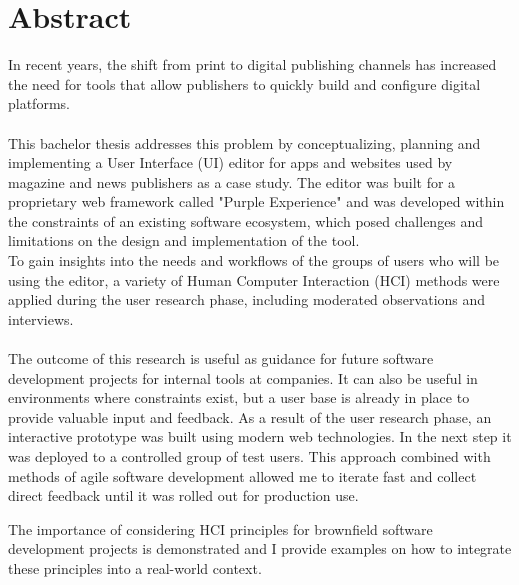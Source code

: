 %

\chapter{Abstract}

In recent years, the shift from print to digital publishing channels has increased the need for tools that allow publishers to quickly build and configure digital platforms.
\\\\
This bachelor thesis addresses this problem by conceptualizing, planning and implementing a User Interface (UI) editor for apps and websites used by magazine and news publishers as a case study.
The editor was built for a proprietary web framework called "Purple Experience" and was developed within the constraints of an existing software ecosystem, which posed challenges and limitations on the design and implementation of the tool.
\\
To gain insights into the needs and workflows of the groups of users who will be using the editor, a variety of Human Computer Interaction (HCI) methods were applied during the user research phase, including moderated observations and interviews. 
\\\\
The outcome of this research is useful as guidance for future software development projects for internal tools at companies. It can also be useful in environments where constraints exist, but a user base is already in place to provide valuable input and feedback.
As a result of the user research phase, an interactive prototype was built using modern web technologies.
In the next step it was deployed to a controlled group of test users.
This approach combined with methods of agile software development allowed me to iterate fast and collect direct feedback until it was rolled out for production use.

The importance of considering HCI principles for brownfield software development projects is demonstrated and I provide examples on how to integrate these principles into a real-world context.